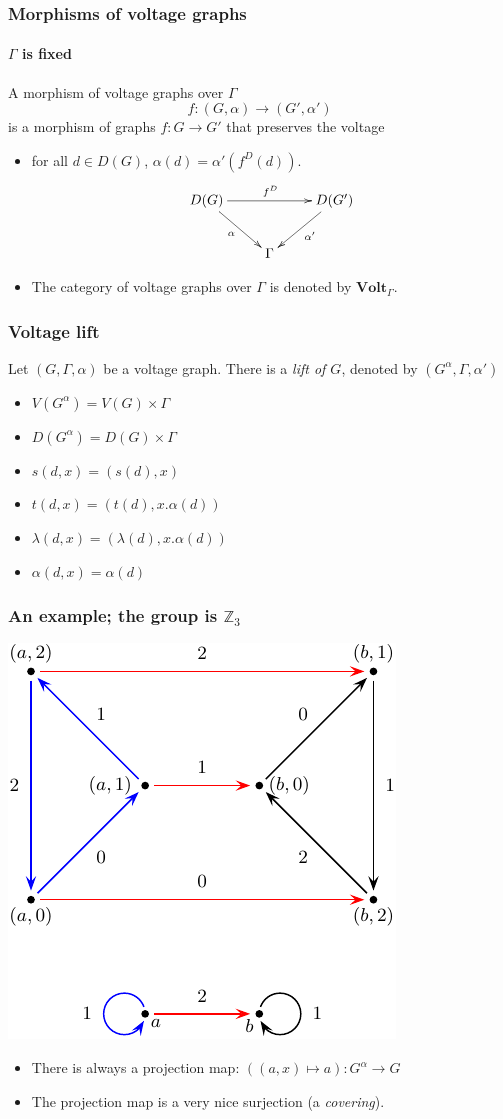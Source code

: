 \documentclass{beamer}
\newcommand{\Volt}{\mathbf{Volt}}
\begin{document}
\begin{frame}
\frametitle{Morphisms of voltage graphs}
\framesubtitle{$Γ$ is fixed}
A morphism of voltage graphs over $\Gamma$ 
\[
f\colon(G,α)\to(G',α')
\]
is a morphism of graphs
$f\colon G\to G'$ that preserves the voltage 
\begin{itemize}
\item for all $d\in D(G)$, $α(d)=α'(f^D(d))$.
\[
\xymatrix{
D(G)
	\ar[rr]^{f^D}
	\ar[rd]_\alpha
&
~
&
D(G')
	\ar[ld]^{\alpha'}
\\
~
&
\Gamma
}
\]
\item The category of voltage graphs over $\Gamma$ is denoted by $\Volt_Γ$.
\end{itemize}
\end{frame}

\begin{frame}
\frametitle{Voltage lift}
\begin{definition}\cite{gross1974voltage}
\label{def:derived} 
Let $(G,Γ,α)$ be a voltage graph. There is a {\em lift of $G$},
denoted by $(G^α,Γ,α')$
\begin{itemize}
\item $V(G^α)=V(G)×Γ$
\item $D(G^α)=D(G)×Γ$
\item $s(d,x)=(s(d),x)$
\item $t(d,x)=(t(d),x.α(d))$
\item $λ(d,x)=(λ(d),x.α(d))$
\item $α(d,x)=α(d)$
\end{itemize}
\end{definition}
\end{frame}
\begin{frame}
\frametitle{An example; the group is $\mathbb Z_3$}
\begin{center}
\includegraphics[scale=0.8]{derived1}
\end{center}
\begin{itemize}
\item There is always a projection map: $((a,x)\mapsto a)\colon G^α\to G$
\item The projection map is a very nice surjection (a {\em covering}).
\end{itemize}
\end{frame}
\end{document}
